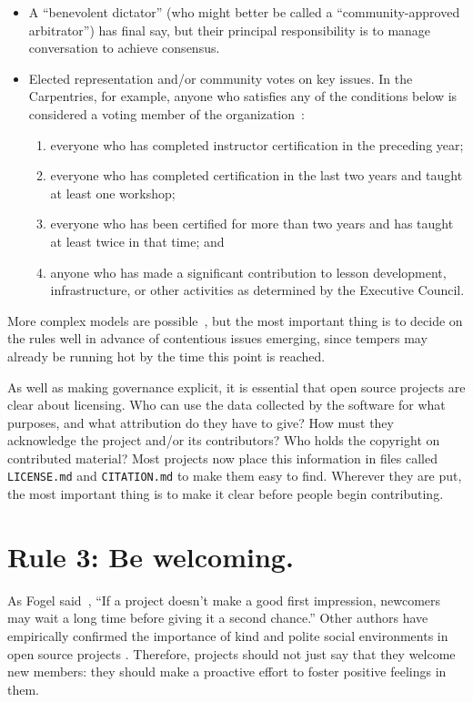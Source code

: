 \documentclass[10pt,letterpaper]{article}
\newcommand{\rulemajor}[1]{\section*{#1}}
\begin{document}
\begin{itemize}
	
\item
  A ``benevolent dictator'' (who might better be called a ``community-approved arbitrator'') has final say,
  but their principal responsibility is to manage conversation to achieve consensus.
	
\item
  Elected representation and/or community votes on key issues.
  In the Carpentries,
  for example,
  anyone who satisfies any of the conditions below is considered a voting member of the organization~\cite{carpentries-bylaws}:
  \begin{enumerate}
  \item
    everyone who has completed instructor certification in the preceding year;
  \item
    everyone who has completed certification in the last two years and taught at least one workshop;
  \item
    everyone who has been certified for more than two years and has taught at least twice in that time; and
  \item
    anyone who has made a significant contribution to lesson development, infrastructure, or other activities
    as determined by the Executive Council.
  \end{enumerate}

\end{itemize}

More complex models are possible~\cite{apache-governance},
but the most important thing is to decide on the rules well in advance of contentious issues emerging,
since tempers may already be running hot by the time this point is reached.

As well as making governance explicit,
it is essential that open source projects are clear about licensing.
Who can use the data collected by the software for what purposes,
and what attribution do they have to give?
How must they acknowledge the project and/or its contributors?
Who holds the copyright on contributed material?
Most projects now place this information in files called \texttt{LICENSE.md} and \texttt{CITATION.md}
to make them easy to find.
Wherever they are put,
the most important thing is to make it clear before people begin contributing.

\rulemajor{Rule 3: Be welcoming.}

As Fogel said~\cite{fogel2005},
``If a project doesn't make a good first impression, newcomers may wait a long time before giving it a second chance.''
Other authors have empirically confirmed the importance of kind and polite social environments
in open source projects \cite{singh2012,steinmacher2013,steinmacher2018a}.
Therefore, projects should not just say that they welcome new members:
they should make a proactive effort to foster positive feelings in them.
\end{document}
